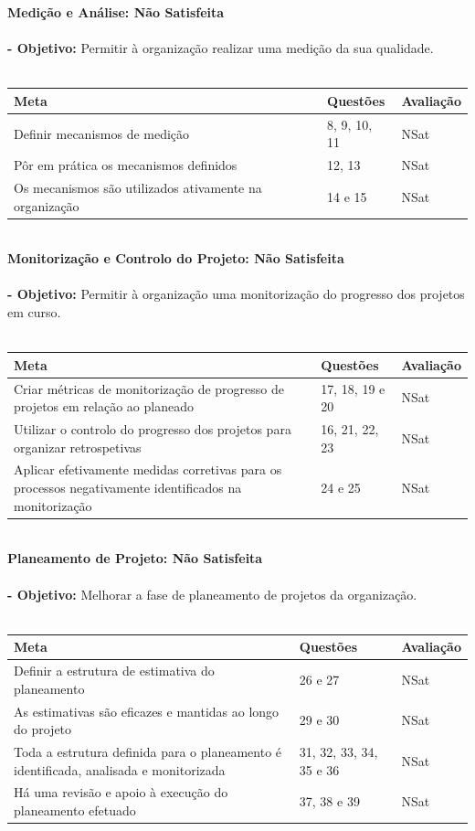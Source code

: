 \documentclass[openany,10pt,a4paper]{article}
\begin{document}
\textbf{Medição e Análise: Não Satisfeita} \\  \\
\textbf{- Objetivo:} Permitir à organização realizar uma medição da sua qualidade. \\
\\
\begin{tabular}{p{3in}|p{1.5in}|p{1.5in}}	
\textbf{Meta} & \textbf{Questões} & \textbf{Avaliação} \\ \hline
Definir mecanismos de medição & 8, 9, 10, 11 & NSat \\
Pôr em prática os mecanismos definidos  & 12, 13 & NSat \\
Os mecanismos são utilizados ativamente na organização & 14 e 15 & NSat \\
\end{tabular} \\

\textbf{Monitorização e Controlo do Projeto: Não Satisfeita} \\  \\
\textbf{- Objetivo:} Permitir à organização uma monitorização do progresso dos projetos em curso. \\
\\
\begin{tabular}{p{3in}|p{1.5in}|p{1.5in}}	
\textbf{Meta} & \textbf{Questões} & \textbf{Avaliação} \\ \hline
Criar métricas de monitorização de progresso de projetos em relação ao planeado & 17, 18, 19 e 20 & NSat \\
Utilizar o controlo do progresso dos projetos para organizar retrospetivas & 16, 21, 22, 23 & NSat \\
Aplicar efetivamente medidas corretivas para os processos negativamente identificados na monitorização & 24 e 25 & NSat \\
\end{tabular} \\

\textbf{Planeamento de Projeto: Não Satisfeita} \\  \\
\textbf{- Objetivo:} Melhorar a fase de planeamento de projetos da organização. \\
\\
\begin{tabular}{p{3in}|p{1.5in}|p{1.5in}}	
\textbf{Meta} & \textbf{Questões} & \textbf{Avaliação} \\ \hline
Definir a estrutura de estimativa do planeamento & 26 e 27 & NSat \\
As estimativas são eficazes e mantidas ao longo do projeto & 29 e 30 & NSat \\
Toda a estrutura definida para o planeamento é identificada, analisada e monitorizada & 31, 32, 33, 34, 35 e 36 & NSat \\ 
Há uma revisão e apoio à execução do planeamento efetuado & 37, 38 e 39 & NSat \\
\end{tabular} 
\end{document}
